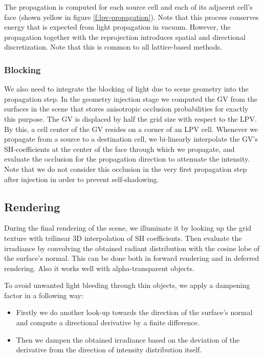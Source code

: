 The propagation is computed for each source cell and each of its adjacent cell's face (shown yellow in figure \ref{f:lpv-propagation}). Note that this process conserves energy that is expected from light propagation in vacuum. However, the propagation together with the reprojection introduces spatial and directional discretization. Note that this is common to all lattice-based methods.



\subsubsection{Blocking}
We also need to integrate the blocking of light due to scene geometry into the propagation step. In the geometry injection stage we computed the GV from the surfaces in the scene that stores anisotropic occlusion probabilities for exactly this purpose. The GV is displaced by half the grid size with respect to the LPV. By this, a cell center of the GV resides on a corner of an LPV cell. Whenever we propagate from a source to a destination cell, we bi-linearly interpolate the GV's SH-coefficients at the center of the face through which we propagate, and evaluate the occlusion for the propagation direction to attenuate the intensity. Note that we do not consider this occlusion in the very first propagation step after injection in order to prevent self-shadowing.





\subsection{Rendering}
During the final rendering of the scene, we illuminate it by looking up the grid texture with trilinear 3D interpolation of SH coefficients. Then evaluate the irradiance by convolving the obtained radiant distribution with the cosine lobe of the surface's normal. This can be done both in forward rendering and in deferred rendering. Also it works well with alpha-transparent objects.

To avoid unwanted light bleeding through thin objects, we apply a dampening factor in a following way:

\begin{itemize}
	\item Firstly we do another look-up towards the direction of the surface's normal and compute a directional derivative by a finite difference.
	\item Then we dampen the obtained irradiance based on the deviation of the derivative from the direction of intensity distribution itself.
\end{itemize}




